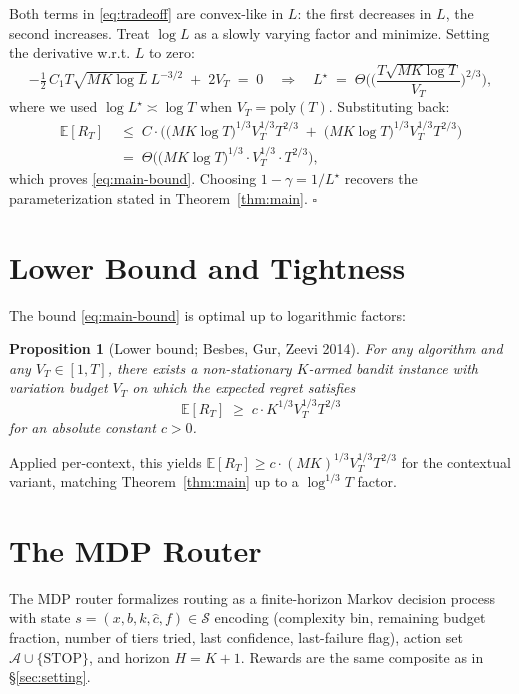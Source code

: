 \documentclass[11pt]{article}
\newtheorem{proposition}[theorem]{Proposition}
\theoremstyle{definition}
\newcommand{\E}{\mathbb{E}}
\begin{document}
Both terms in \eqref{eq:tradeoff} are convex-like in $L$: the first decreases in $L$, the second increases. Treat $\log L$ as a slowly varying factor and minimize. Setting the derivative w.r.t. $L$ to zero:
\[
    -\tfrac{1}{2}\,C_1 T \sqrt{MK \log L}\, L^{-3/2} \;+\; 2 V_T \;=\; 0
    \quad \Longrightarrow \quad
    L^\star \;=\; \Theta\!\bigg(\Big(\frac{T \sqrt{MK \log T}}{V_T}\Big)^{\!2/3}\bigg),
\]
where we used $\log L^\star \asymp \log T$ when $V_T = \mathrm{poly}(T)$. Substituting back:
\begin{align}
    \E[R_T] &\;\leq\; C \cdot \Big(\big(MK\log T\big)^{1/3} V_T^{1/3} T^{2/3} \;+\; \big(MK\log T\big)^{1/3} V_T^{1/3} T^{2/3}\Big) \nonumber\\
            &\;=\; \Theta\!\Big( \big(MK \log T\big)^{1/3} \cdot V_T^{1/3} \cdot T^{2/3} \Big),
\end{align}
which proves \eqref{eq:main-bound}. Choosing $1 - \gamma = 1/L^\star$ recovers the parameterization stated in Theorem~\ref{thm:main}. \hfill$\square$

\section{Lower Bound and Tightness}

The bound \eqref{eq:main-bound} is optimal up to logarithmic factors:
\begin{proposition}[Lower bound; Besbes, Gur, Zeevi 2014]
For any algorithm and any $V_T \in [1, T]$, there exists a non-stationary $K$-armed bandit instance with variation budget $V_T$ on which the expected regret satisfies
\[
    \E[R_T] \;\geq\; c \cdot K^{1/3} V_T^{1/3} T^{2/3}
\]
for an absolute constant $c > 0$.
\end{proposition}

Applied per-context, this yields $\E[R_T] \geq c \cdot (MK)^{1/3} V_T^{1/3} T^{2/3}$ for the contextual variant, matching Theorem~\ref{thm:main} up to a $\log^{1/3} T$ factor.

\section{The MDP Router}
\label{sec:mdp}

The MDP router formalizes routing as a finite-horizon Markov decision process with state $s = (x, b, k, \widehat{c}, f) \in \mathcal{S}$ encoding (complexity bin, remaining budget fraction, number of tiers tried, last confidence, last-failure flag), action set $\mathcal{A} \cup \{\mathrm{STOP}\}$, and horizon $H = K+1$. Rewards are the same composite as in \S\ref{sec:setting}.
\end{document}

